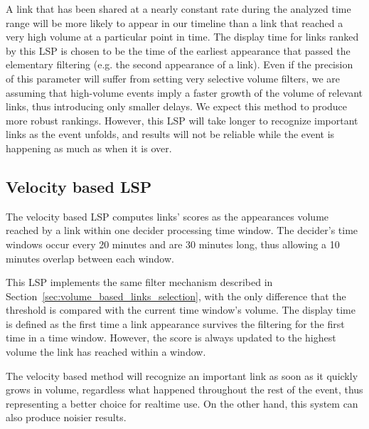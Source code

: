 \documentclass{sig-alternate-somus}
\begin{document}
A link that has been shared at a nearly constant rate during the analyzed time range will be more likely to appear in our timeline than a link that reached a very high volume at a particular point in time. The display time for links ranked by this LSP is chosen to be the time of the earliest appearance that passed the elementary filtering (e.g. the second appearance of a link). Even if the precision of this parameter will suffer from setting very selective volume filters, we are assuming that high-volume events imply a faster growth of the volume of relevant links, thus introducing only smaller delays. We expect this method to produce more robust rankings. However, this LSP will take longer to recognize important links as the event unfolds, and results will not be reliable while the event is happening as much as when it is over.

\subsection{Velocity based LSP}
\label{sec:velocity_based_links_selection}
The velocity based LSP computes links' scores as the appearances volume reached by a link within one decider processing time window. The decider's time windows occur every 20 minutes and are 30 minutes long, thus allowing a 10 minutes overlap between each window.

This LSP implements the same filter mechanism described in Section~\ref{sec:volume_based_links_selection}, with the only difference that the threshold is compared with the current time window's volume. The display time is defined as the first time a link appearance survives the filtering for the first time in a time window. However, the score is always updated to the highest volume the link has reached within a window.

The velocity based method will recognize an important link as soon as it quickly grows in volume, regardless what happened throughout the rest of the event, thus representing a better choice for realtime use. On the other hand, this system can also produce noisier results.

\end{document}
